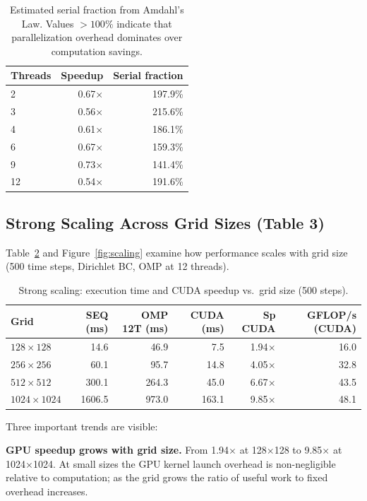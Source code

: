\documentclass[12pt,a4paper]{article}
\begin{document}
\begin{table}[H]
\centering
\caption{Estimated serial fraction from Amdahl's Law.
Values $>100\%$ indicate that parallelization overhead dominates
over computation savings.}
\label{tab:amdahl}
\begin{tabular}{lrr}
\toprule
Threads & Speedup & Serial fraction \\
\midrule
 2 & 0.67$\times$ & 197.9\% \\
 3 & 0.56$\times$ & 215.6\% \\
 4 & 0.61$\times$ & 186.1\% \\
 6 & 0.67$\times$ & 159.3\% \\
 9 & 0.73$\times$ & 141.4\% \\
12 & 0.54$\times$ & 191.6\% \\
\bottomrule
\end{tabular}
\end{table}

\subsection{Strong Scaling Across Grid Sizes (Table 3)}
\label{sec:strong}

Table~\ref{tab:scaling} and Figure~\ref{fig:scaling} examine how
performance scales with grid size (500 time steps, Dirichlet BC,
OMP at 12 threads).

\begin{table}[H]
\centering
\caption{Strong scaling: execution time and CUDA speedup vs.\ grid size
(500 steps).}
\label{tab:scaling}
\begin{tabular}{lrrrr r}
\toprule
Grid & SEQ (ms) & OMP 12T (ms) & CUDA (ms) & Sp CUDA & GFLOP/s (CUDA) \\
\midrule
$128\times128$   &   14.6 &  46.9 &   7.5 &  1.94$\times$ & 16.0 \\
$256\times256$   &   60.1 &  95.7 &  14.8 &  4.05$\times$ & 32.8 \\
$512\times512$   &  300.1 & 264.3 &  45.0 &  6.67$\times$ & 43.5 \\
$1024\times1024$ & 1606.5 & 973.0 & 163.1 &  9.85$\times$ & 48.1 \\
\bottomrule
\end{tabular}
\end{table}

Three important trends are visible:

\textbf{GPU speedup grows with grid size.}
From 1.94$\times$ at 128$\times$128 to 9.85$\times$ at
1024$\times$1024. At small sizes the GPU kernel launch overhead
is non-negligible relative to computation; as the grid grows the
ratio of useful work to fixed overhead increases.
\end{document}
